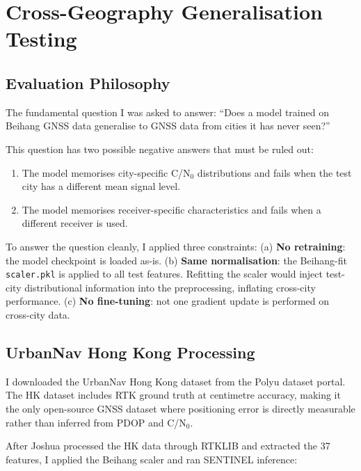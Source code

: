 \documentclass[12pt,a4paper]{article}
\newcommand{\code}[1]{\texttt{#1}}
\begin{document}
\section{Cross-Geography Generalisation Testing}

\subsection{Evaluation Philosophy}

The fundamental question I was asked to answer:
``Does a model trained on Beihang GNSS data generalise to GNSS data from cities it has
never seen?''

This question has two possible negative answers that must be ruled out:
\begin{enumerate}
  \item The model memorises city-specific C/N$_0$ distributions and fails when the
    test city has a different mean signal level.
  \item The model memorises receiver-specific characteristics and fails when a
    different receiver is used.
\end{enumerate}

To answer the question cleanly, I applied three constraints:
(a) \textbf{No retraining}: the model checkpoint is loaded as-is.
(b) \textbf{Same normalisation}: the Beihang-fit \code{scaler.pkl} is applied to all
  test features. Refitting the scaler would inject test-city distributional information
  into the preprocessing, inflating cross-city performance.
(c) \textbf{No fine-tuning}: not one gradient update is performed on cross-city data.

\subsection{UrbanNav Hong Kong Processing}

I downloaded the UrbanNav Hong Kong dataset \cite{hsu2021urbannav} from the Polyu
dataset portal.
The HK dataset includes RTK ground truth at centimetre accuracy, making it the only
open-source GNSS dataset where positioning error is directly measurable rather than
inferred from PDOP and C/N$_0$.

After Joshua processed the HK data through RTKLIB and extracted the 37 features,
I applied the Beihang scaler and ran SENTINEL inference:
\end{document}
